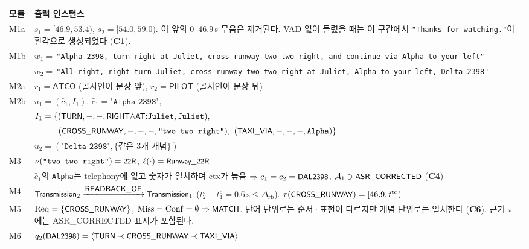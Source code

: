 \documentclass[10pt,a4paper]{article}
\newcommand{\ATCO}{\textsf{ATCO}}
\newcommand{\PILOT}{\textsf{PILOT}}
\newcommand{\cmd}[1]{\textsf{\small #1}}
\newcommand{\ch}[1]{\textbf{\textcolor{red!60!black}{#1}}}
\begin{document}
\begin{center}\small
\begin{tabularx}{\textwidth}{@{}l>{\raggedright\arraybackslash}X@{}}
\toprule
모듈 & 출력 인스턴스\\\midrule
M1a & $s_1=[46.9, 53.4)$, $s_2=[54.0, 59.0)$. 이 앞의 0--46.9\,s 무음은 제거된다. VAD 없이 돌렸을 때는 이 구간에서 \texttt{"Thanks for watching."}이 환각으로 생성되었다 (\ch{C1}).\\
M1b & $w_1=$\,\texttt{"Alpha 2398, turn right at Juliet, cross runway two two right, and continue via Alpha to your left"}\\
& $w_2=$\,\texttt{"All right, right turn Juliet, cross runway two two right at Juliet, Alpha to your left, Delta 2398"}\\
M2a & $r_1=\ATCO$ (콜사인이 문장 앞), $r_2=\PILOT$ (콜사인이 문장 뒤)\\
M2b & $u_1=(\hat c_1, I_1)$, $\hat c_1=\texttt{"Alpha 2398"}$,\\
& $I_1=\{(\cmd{TURN},-,-,\cmd{RIGHT}{\wedge}\cmd{AT}{:}\texttt{Juliet},\texttt{Juliet}),$\\
& $\phantom{I_1=\{}(\cmd{CROSS\_RUNWAY},-,-,-,\texttt{"two two right"}),\ (\cmd{TAXI\_VIA},-,-,-,\texttt{Alpha})\}$\\
& $u_2=(\texttt{"Delta 2398"},\{\text{같은 3개 개념}\})$\\
M3 & $\nu(\texttt{"two two right"})=\cmd{22R}$, $\ell(\cdot)=\cmd{Runway\_22R}$\\
& $\hat c_1$의 \texttt{Alpha}는 telephony에 없고 숫자가 일치하며 $\mathrm{ctx}$가 높음 $\Rightarrow c_1=c_2=\cmd{DAL2398}$, $\mathcal{A}_1\ni\cmd{ASR\_CORRECTED}$ (\ch{C4})\\
M4 & $\cmd{Transmission}_2\xrightarrow{\cmd{READBACK\_OF}}\cmd{Transmission}_1$ ($t^s_2-t^e_1=0.6\,\mathrm{s}\le\Delta_{\mathrm{rb}}$). $\tau(\cmd{CROSS\_RUNWAY}) = [46.9, t^{\mathrm{to}})$\\
M5 & $\mathrm{Req}=\{\cmd{CROSS\_RUNWAY}\}$, $\mathrm{Miss}=\mathrm{Conf}=\emptyset\Rightarrow\cmd{MATCH}$. 단어 단위로는 순서·표현이 다르지만 개념 단위로는 일치한다 (\ch{C6}). 근거 $\pi$에는 \cmd{ASR\_CORRECTED} 표시가 포함된다.\\
M6 & $q_2(\cmd{DAL2398}) = \langle\cmd{TURN}\prec\cmd{CROSS\_RUNWAY}\prec\cmd{TAXI\_VIA}\rangle$\\
\bottomrule
\end{tabularx}
\end{center}

\end{document}
